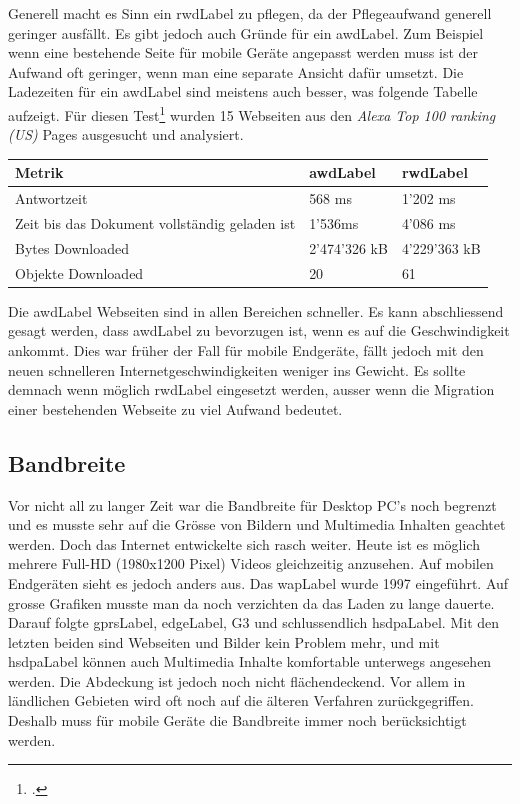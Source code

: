 Generell macht es Sinn ein \gls{rwdLabel} zu pflegen, da der Pflegeaufwand generell geringer ausfällt. Es gibt jedoch auch Gründe für ein \gls{awdLabel}. Zum Beispiel wenn eine bestehende Seite für mobile Geräte angepasst werden muss ist der Aufwand oft geringer, wenn man eine separate Ansicht dafür umsetzt. Die Ladezeiten für ein \gls{awdLabel} sind meistens auch besser, was folgende Tabelle aufzeigt. 
Für diesen Test\footcite{Adaptive_vs_Responsive_Web_Design_Which_Is_Right_for_Your_Site_-_Catchpoints_Blog_2015-06-01} wurden 15 Webseiten aus den \textit{Alexa Top 100 ranking (US)} Pages ausgesucht und analysiert.

\begin{center}
    \begin{tabular}{ | l | l | l |}
    \hline
    Metrik & \gls{awdLabel} & \gls{rwdLabel} \\ \hline
    Antwortzeit & 568 ms & 1'202 ms \\ \hline
    Zeit bis das Dokument vollständig geladen ist & 1'536ms & 4'086 ms \\ \hline
	Bytes Downloaded & 2'474'326 kB & 4'229'363 kB \\ \hline
	Objekte Downloaded & 20 & 61 \\ \hline
    \end{tabular}
\end{center}

Die \gls{awdLabel} Webseiten sind in allen Bereichen schneller. Es kann abschliessend gesagt werden, dass \gls{awdLabel} zu bevorzugen ist, wenn es auf die Geschwindigkeit ankommt. Dies war früher der Fall für mobile Endgeräte, fällt jedoch mit den neuen schnelleren Internetgeschwindigkeiten weniger ins Gewicht. Es sollte demnach wenn möglich \gls{rwdLabel} eingesetzt werden, ausser wenn die Migration einer bestehenden Webseite zu viel Aufwand bedeutet.


\subsection{Bandbreite}
\label{sec:requirementsengineerin:endgeraete:bandbreite}
Vor nicht all zu langer Zeit war die Bandbreite für Desktop PC's noch begrenzt und es musste sehr auf die Grösse von Bildern und Multimedia Inhalten geachtet werden. Doch das Internet entwickelte sich rasch weiter. Heute ist es möglich mehrere Full-HD (1980x1200 Pixel) Videos gleichzeitig anzusehen. Auf mobilen Endgeräten sieht es jedoch anders aus. Das \gls{wapLabel} wurde 1997 eingeführt. Auf grosse Grafiken musste man da noch verzichten da das Laden zu lange dauerte. Darauf folgte \gls{gprsLabel}, \gls{edgeLabel}, G3 und schlussendlich \gls{hsdpaLabel}. Mit den letzten beiden sind Webseiten und Bilder kein Problem mehr, und mit \gls{hsdpaLabel} können auch Multimedia Inhalte komfortable unterwegs angesehen werden. Die Abdeckung ist jedoch noch nicht flächendeckend. Vor allem in ländlichen Gebieten wird oft noch auf die älteren Verfahren zurückgegriffen. Deshalb muss für mobile Geräte die Bandbreite immer noch berücksichtigt werden.

